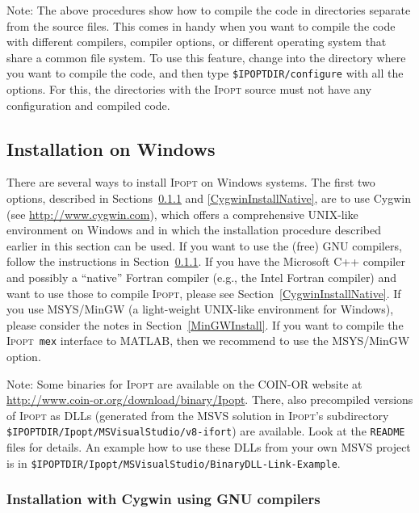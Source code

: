 \documentclass[10pt]{article}
\newcommand{\Ipopt}{\textsc{Ipopt}\xspace}
\newcommand{\Matlab}{\textsc{MATLAB}\xspace}
\begin{document}
Note: The above procedures show how to compile the code in directories
separate from the source files.  This comes in handy when you want to
compile the code with different compilers, compiler options, or
different operating system that share a common file system.  To use
this feature, change into the directory where you want to compile the
code, and then type {\tt \$IPOPTDIR/configure} with all the options.
For this, the directories with the \Ipopt source must not have any
configuration and compiled code.

\subsection{Installation on Windows}\label{WindowsInstall}

There are several ways to install \Ipopt on Windows systems.  The
first two options, described in Sections~\ref{CygwinInstall} and
\ref{CygwinInstallNative}, are to use Cygwin (see
\url{http://www.cygwin.com}), which offers a comprehensive UNIX-like
environment on Windows and in which the installation procedure
described earlier in this section can be used.  If you want to use the
(free) GNU compilers, follow the instructions in
Section~\ref{CygwinInstall}.  If you have the Microsoft C++ compiler
and possibly a ``native'' Fortran compiler (e.g., the Intel Fortran
compiler) and want to use those to compile \Ipopt, please see
Section~\ref{CygwinInstallNative}.  If you use MSYS/MinGW (a
light-weight UNIX-like environment for Windows), please consider the
notes in Section~\ref{MinGWInstall}.
If you want to compile the \Ipopt\ {\tt mex} interface to \Matlab, then we recommend to use the MSYS/MinGW option.


Note: Some binaries for \Ipopt are available on the COIN-OR website at
\url{http://www.coin-or.org/download/binary/Ipopt}.
There, also precompiled versions of \Ipopt as DLLs (generated from
the MSVS solution in \Ipopt's subdirectory
\texttt{\$IPOPTDIR/Ipopt/MSVisualStudio/v8-ifort}) are available.  Look at the
\texttt{README} files for details.  An example how to use these DLLs
from your own MSVS project is in
\texttt{\$IPOPTDIR/Ipopt/MSVisualStudio/BinaryDLL-Link-Example}.


\subsubsection{Installation with Cygwin using GNU compilers}\label{CygwinInstall}
\end{document}
